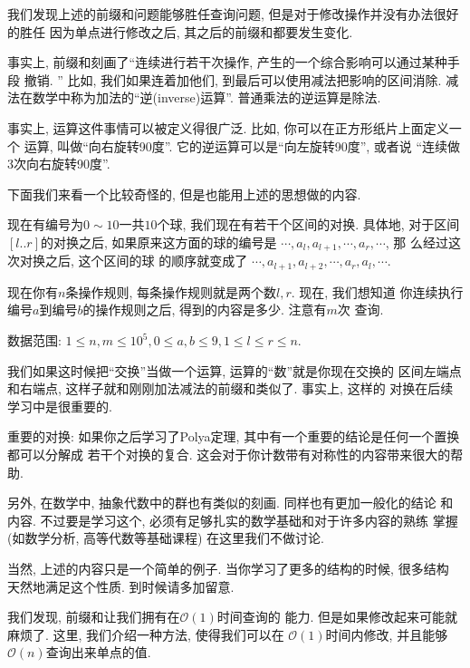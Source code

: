 我们发现上述的前缀和问题能够胜任查询问题, 但是对于修改操作并没有办法很好的胜任
因为单点进行修改之后, 其之后的前缀和都要发生变化. 

事实上, 前缀和刻画了``连续进行若干次操作, 产生的一个综合影响可以通过某种手段
撤销. '' 比如, 我们如果连着加他们, 到最后可以使用减法把影响的区间消除. 
减法在数学中称为加法的``逆(inverse)运算''. 普通乘法的逆运算是除法. 

事实上, 运算这件事情可以被定义得很广泛. 比如, 你可以在正方形纸片上面定义一个
运算, 叫做``向右旋转90度''. 它的逆运算可以是``向左旋转90度'', 或者说
``连续做3次向右旋转90度''. 

下面我们来看一个比较奇怪的, 但是也能用上述的思想做的内容. 

\begin{example}
    现在有编号为$0\sim 10$一共$10$个球, 我们现在有若干个区间的对换. 具体地, 
    对于区间$[l..r]$的对换之后, 如果原来这方面的球的编号是
    $\cdots, a_l, a_{l+1}, \cdots, a_r, \cdots$, 那
    么经过这次对换之后, 这个区间的球
    的顺序就变成了
    $\cdots, a_{l+1}, a_{l+2}, \cdots , a_r, a_l,\cdots $. 

    现在你有$n$条操作规则, 每条操作规则就是两个数$l,r$. 现在, 我们想知道
    你连续执行编号$a$到编号$b$的操作规则之后, 得到的内容是多少. 注意有$m$次
    查询. 

    数据范围: $1\leq n, m \leq 10^5, 0\leq a, b\leq 9, 1\leq l\leq r\leq n.$
\end{example}

我们如果这时候把``交换''当做一个运算, 运算的``数''就是你现在交换的
区间左端点和右端点, 这样子就和刚刚加法减法的前缀和类似了. 事实上, 这样的
对换在后续学习中是很重要的. 

\begin{remark}
    重要的对换: 如果你之后学习了Polya定理, 其中有一个重要的结论是任何一个置换都可以分解成
    若干个对换的复合. 这会对于你计数带有对称性的内容带来很大的帮助. 
    
    另外, 在数学中, 抽象代数中的群也有类似的刻画. 同样也有更加一般化的结论
    和内容. 不过要是学习这个, 必须有足够扎实的数学基础和对于许多内容的熟练
    掌握(如数学分析, 高等代数等基础课程)
    在这里我们不做讨论. 
\end{remark}

当然, 上述的内容只是一个简单的例子. 当你学习了更多的结构的时候, 很多结构
天然地满足这个性质. 到时候请多加留意. 

 我们发现, 前缀和让我们拥有在$\mathcal O(1)$时间查询的
能力. 但是如果修改起来可能就麻烦了. 这里, 我们介绍一种方法, 使得我们可以在
$\mathcal O(1)$时间内修改, 并且能够$\mathcal O(n)$查询出来单点的值. 

